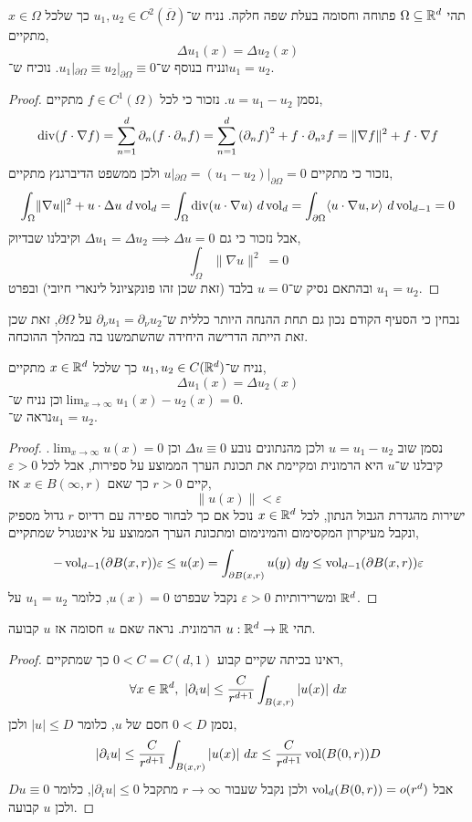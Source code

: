 \question{}
\subquestion{}
תהי $\Omega \subseteq \mathbb{R}^d$ פתוחה וחסומה בעלת שפה חלקה.
נניח ש־$u_1, u_2 \in C^2(\overline{\Omega})$ כך שלכל $x \in \Omega$ מתקיים,
\[
	\Delta u_1(x)
	= \Delta u_2(x)
\]
ונניח בנוסף ש־$u_1 |_{\partial \Omega} \equiv u_2 |_{\partial \Omega} \equiv 0$.
נוכיח ש־$u_1 = u_2$.
\begin{proof}
	נסמן $u = u_1 - u_2$.
	נזכור כי לכל $f \in C^1(\Omega)$ מתקיים,
	\[
		\operatorname{div}(f \cdot \nabla f)
		= \sum_{n = 1}^d \partial_n (f \cdot \partial_n f)
		= \sum_{n = 1}^d {(\partial_n f)}^2 + f \cdot \partial_{n^2} f
		= \lVert \nabla f \rVert^2 + f \cdot \nabla f
	\]
	נזכור כי מתקיים $u |_{\partial \Omega} = (u_1 - u_2) |_{\partial \Omega} = 0$ ולכן ממשפט הדיברגנץ מתקיים,
	\[
		\int_{\Omega} \lVert \nabla u \rVert^2 + u \cdot \Delta u\ d\vol_d
		= \int_{\Omega} \Div(u \cdot \nabla u)\ d\vol_d
		= \int_{\partial \Omega} \langle u \cdot \nabla u, \nu \rangle\ d\vol_{d - 1}
		= 0
	\]
	אבל נזכור כי גם $\Delta u_1 = \Delta u_2 \implies \Delta u = 0$ וקיבלנו שבדיוק,
	\[
		\int_{\Omega} \lVert \nabla u \rVert^2\
		= 0
	\]
	ובהתאם נסיק ש־$u = 0$ בלבד (זאת שכן זהו פונקציונל לינארי חיובי) ובפרט $u_1 = u_2$.
\end{proof}

\subquestion{}
נבחין כי הסעיף הקודם נכון גם תחת ההנחה היותר כללית ש־$\partial_{\nu} u_1 = \partial_{\nu} u_2$ על $\partial \Omega$,
זאת שכן זאת הייתה הדרישה היחידה שהשתמשנו בה במהלך ההוכחה.

\subquestion{}
נניח ש־$u_1, u_2 \in C(\mathbb{R}^d)$ כך שלכל $x \in \mathbb{R}^d$ מתקיים,
\[
	\Delta u_1(x)
	= \Delta u_2(x)
\]
וכן נניח ש־$\lim_{x \to \infty} u_1(x) - u_2(x) = 0$. \\
נראה ש־$u_1 = u_2$.
\begin{proof}
	נסמן שוב $u = u_1 - u_2$ ולכן מהנתונים נובע $\Delta u \equiv 0$ וכן $\lim_{x \to \infty} u(x) = 0$.
	קיבלנו ש־$u$ היא הרמונית ומקיימת את תכונת הערך הממוצע על ספירות, אבל לכל $\varepsilon > 0$ קיים $r > 0$ כך שאם $x \in B(\infty, r)$ אז,
	\[
		\lVert u(x) \rVert < \varepsilon
	\]
	ישירות מהגדרת הגבול הנתון,
	לכל $x \in \mathbb{R}^d$ נוכל אם כך לבחור ספירה עם רדיוס $r$ גדול מספיק ונקבל מעיקרון המקסימום והמינימום ומתכונת הערך הממוצע על אינטגרל שמתקיים,
	\[
		- \operatorname{vol}_{d - 1}(\partial B(x, r)) \varepsilon
		\le u(x)
		= \int_{\partial B(x, r)} u(y)\ dy
		\le \operatorname{vol}_{d - 1}(\partial B(x, r)) \varepsilon
	\]
	ומשרירותיות $\varepsilon > 0$ נקבל שבפרט $u(x) = 0$, כלומר $u_1 = u_2$ על $\mathbb{R}^d$.
\end{proof}

\question{}
תהי $u : \mathbb{R}^d \to \mathbb{R}$ הרמונית.
נראה שאם $u$ חסומה אז $u$ קבועה.
\begin{proof}
	ראינו בכיתה שקיים קבוע $0 < C = C(d, 1)$ כך שמתקיים,
	\[
		\forall x \in \RR^d,\ 
		|\partial_i u| \le \frac{C}{r^{d + 1}} \int_{B(x, r)} |u(x)|\ dx
	\]
	נסמן $0 < D$ חסם של $u$, כלומר $|u| \le D$ ולכן,
	\[
		|\partial_i u|
		\le \frac{C}{r^{d + 1}} \int_{B(x, r)} |u(x)|\ dx
		\le \frac{C}{r^{d + 1}} \operatorname{vol}(B(0, r)) D
	\]
	אבל $\operatorname{vol}_d(B(0, r)) = o(r^d)$ ולכן נקבל שעבור $r \to \infty$ מתקבל $|\partial_i u| \le 0$, כלומר $D u \equiv 0$ ולכן $u$ קבועה.
\end{proof}


